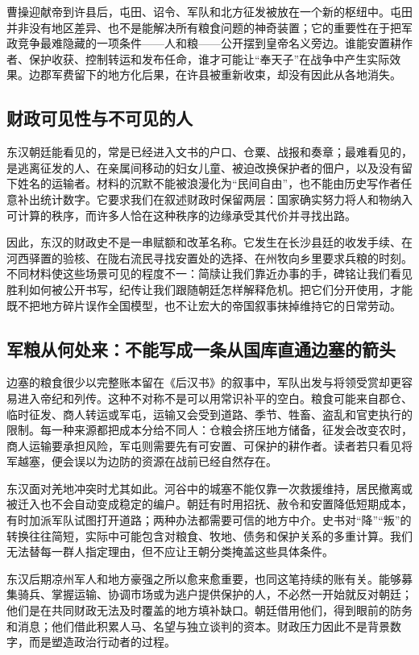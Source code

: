 曹操迎献帝到许县后，屯田、诏令、军队和北方征发被放在一个新的枢纽中。屯田并非没有地区差异、也不是能解决所有粮食问题的神奇装置；它的重要性在于把军政竞争最难隐藏的一项条件——人和粮——公开摆到皇帝名义旁边。谁能安置耕作者、保护收获、控制转运和发布任命，谁才可能让“奉天子”在战争中产生实际效果。边郡军费留下的地方化后果，在许县被重新收束，却没有因此从各地消失。

\subsection{财政可见性与不可见的人}

东汉朝廷能看见的，常是已经进入文书的户口、仓粟、战报和奏章；最难看见的，是逃离征发的人、在亲属间移动的妇女儿童、被迫改换保护者的佃户，以及没有留下姓名的运输者。材料的沉默不能被浪漫化为“民间自由”，也不能由历史写作者任意补出统计数字。它要求我们在叙述财政时保留两层：国家确实努力将人和物纳入可计算的秩序，而许多人恰在这种秩序的边缘承受其代价并寻找出路。

因此，东汉的财政史不是一串赋额和改革名称。它发生在长沙县廷的收发手续、在河西驿置的验核、在陇右流民寻找安置处的选择、在州牧向乡里要求兵粮的时刻。不同材料使这些场景可见的程度不一：简牍让我们靠近办事的手，碑铭让我们看见胜利如何被公开书写，纪传让我们跟随朝廷怎样解释危机。把它们分开使用，才能既不把地方碎片误作全国模型，也不让宏大的帝国叙事抹掉维持它的日常劳动。

\subsection{军粮从何处来：不能写成一条从国库直通边塞的箭头}

边塞的粮食很少以完整账本留在《后汉书》的叙事中，军队出发与将领受赏却更容易进入帝纪和列传。这种不对称不是可以用常识补平的空白。粮食可能来自郡仓、临时征发、商人转运或军屯，运输又会受到道路、季节、牲畜、盗乱和官吏执行的限制。每一种来源都把成本分给不同人：仓粮会挤压地方储备，征发会改变农时，商人运输要承担风险，军屯则需要先有可安置、可保护的耕作者。读者若只看见将军越塞，便会误以为边防的资源在战前已经自然存在。

东汉面对羌地冲突时尤其如此。河谷中的城塞不能仅靠一次救援维持，居民撤离或被迁入也不会自动变成稳定的编户。朝廷有时用招抚、赦令和安置降低短期成本，有时加派军队试图打开道路；两种办法都需要可信的地方中介。史书对“降”“叛”的转换往往简短，实际中可能包含对粮食、牧地、债务和保护关系的多重计算。我们无法替每一群人指定理由，但不应让王朝分类掩盖这些具体条件。

东汉后期凉州军人和地方豪强之所以愈来愈重要，也同这笔持续的账有关。能够募集骑兵、掌握运输、协调市场或为逃户提供保护的人，不必然一开始就反对朝廷；他们是在共同财政无法及时覆盖的地方填补缺口。朝廷借用他们，得到眼前的防务和消息；他们借此积累人马、名望与独立谈判的资本。财政压力因此不是背景数字，而是塑造政治行动者的过程。

